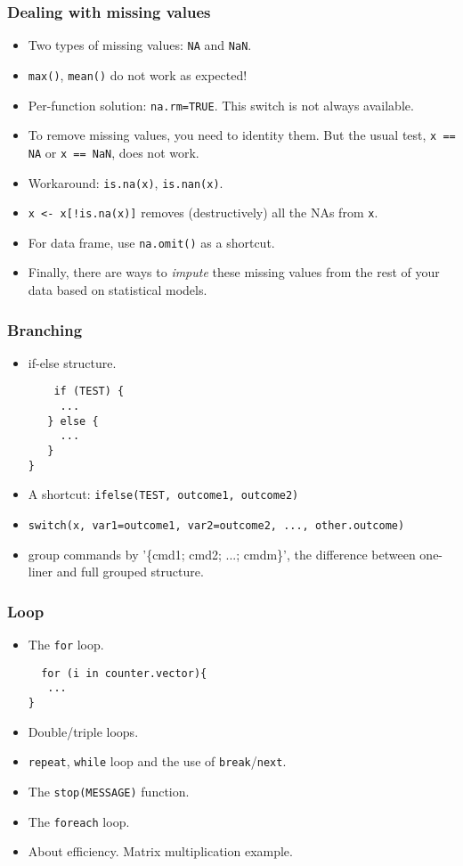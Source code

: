 \begin{frame}
  \frametitle{Dealing with missing values}
  \begin{itemize}
  \item Two types of missing values: \texttt{NA} and \texttt{NaN}.
  \item \texttt{max()}, \texttt{mean()} do not work as expected!
  \item Per-function solution: \texttt{na.rm=TRUE}. This switch is not
    always available.
  \item To remove missing values, you need to identity them. But the
    usual test, \texttt{x == NA} or \texttt{x == NaN}, does not work.
  \item Workaround: \texttt{is.na(x)}, \texttt{is.nan(x)}.
  \item \texttt{x <- x[!is.na(x)]} removes (destructively) all the NAs
    from \texttt{x}.
  \item For data frame, use \texttt{na.omit()} as a shortcut.
  \item Finally, there are ways to \emph{impute} these missing values
    from the rest of your data based on statistical models.
  \end{itemize}
\end{frame}

\begin{frame}[fragile]
  \frametitle{Branching}
  \begin{itemize}
  \item if-else structure.
\begin{verbatim}
    if (TEST) {
     ...
   } else {
     ...
   }
}
\end{verbatim}
  \item A shortcut: \texttt{ifelse(TEST, outcome1, outcome2)}
  \item \texttt{switch(x, var1=outcome1, var2=outcome2, ..., other.outcome)}
  \item group commands by '\{cmd1; cmd2; ...; cmdm\}', the difference
    between one-liner and full grouped structure.
  \end{itemize}
\end{frame}

\begin{frame}[fragile]
  \frametitle{Loop}
  \begin{itemize}
  \item The \texttt{for} loop.
\begin{verbatim}
  for (i in counter.vector){
   ...
}
\end{verbatim}
  \item Double/triple loops.
  \item \texttt{repeat}, \texttt{while} loop and the use of
    \texttt{break}/\texttt{next}.
  \item The \texttt{stop(MESSAGE)} function.
  \item The \texttt{foreach} loop.
  \item About efficiency.  Matrix multiplication example.
  \end{itemize}
\end{frame}

